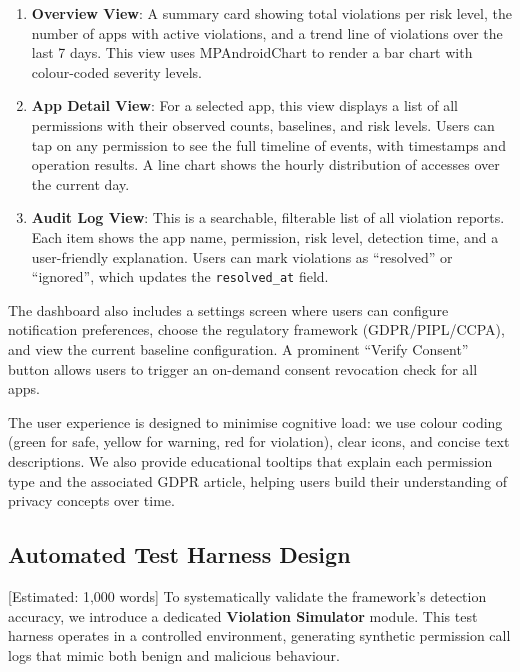 \begin{enumerate}
\item \textbf{Overview View}: A summary card showing total violations per risk level, the number of apps with active violations, and a trend line of violations over the last 7 days. This view uses MPAndroidChart to render a bar chart with colour-coded severity levels.
\item \textbf{App Detail View}: For a selected app, this view displays a list of all permissions with their observed counts, baselines, and risk levels. Users can tap on any permission to see the full timeline of events, with timestamps and operation results. A line chart shows the hourly distribution of accesses over the current day.
\item \textbf{Audit Log View}: This is a searchable, filterable list of all violation reports. Each item shows the app name, permission, risk level, detection time, and a user-friendly explanation. Users can mark violations as ``resolved'' or ``ignored'', which updates the \texttt{resolved\_at} field.
\end{enumerate}

The dashboard also includes a settings screen where users can configure notification preferences, choose the regulatory framework (GDPR/PIPL/CCPA), and view the current baseline configuration. A prominent ``Verify Consent'' button allows users to trigger an on-demand consent revocation check for all apps.

The user experience is designed to minimise cognitive load: we use colour coding (green for safe, yellow for warning, red for violation), clear icons, and concise text descriptions. We also provide educational tooltips that explain each permission type and the associated GDPR article, helping users build their understanding of privacy concepts over time.

\subsection{Automated Test Harness Design} [Estimated: 1,000 words]
To systematically validate the framework's detection accuracy, we introduce a dedicated \textbf{Violation Simulator} module. This test harness operates in a controlled environment, generating synthetic permission call logs that mimic both benign and malicious behaviour.

